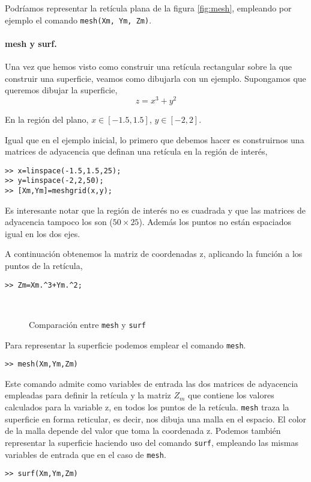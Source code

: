 Podríamos representar la retícula plana de la figura \ref{fig:mesh}, empleando por ejemplo el comando \texttt{mesh(Xm, Ym, Zm)}.

\paragraph{mesh y surf.} Una vez que hemos visto como construir una retícula rectangular sobre la que construir una superficie, veamos como dibujarla con un ejemplo. Supongamos que queremos dibujar la superficie,
\begin{equation*}
z=x^3+y^2
\end{equation*}

En la región del plano, $x\in[-1.5,1.5]$, $y\in[-2,2]$. 

Igual que en el ejemplo inicial, lo primero que debemos hacer es construirnos una matrices de adyacencia que definan una retícula en la región de interés,
\begin{verbatim}
>> x=linspace(-1.5,1.5,25);
>> y=linspace(-2,2,50);
>> [Xm,Ym]=meshgrid(x,y);
\end{verbatim}

Es interesante notar que la región de interés no es cuadrada y que las matrices de adyacencia tampoco los son ($50\times 25$). Además los puntos no están espaciados igual en los dos ejes.

A continuación obtenemos la matriz de coordenadas z, aplicando la función a los puntos de la retícula,

\begin{verbatim}
>> Zm=Xm.^3+Ym.^2;
\end{verbatim}

\begin{figure}[h]
\centering
{} %
{}\\
\caption{Comparación entre \texttt{mesh} y \texttt{surf}}
\end{figure}

Para representar la superficie podemos emplear el comando \texttt{mesh}. 
\begin{verbatim}
>> mesh(Xm,Ym,Zm)
\end{verbatim}

Este comando admite como variables de entrada las dos matrices de adyacencia empleadas para definir la retícula y la matriz $Z_m$ que contiene los valores calculados para la  variable z, en todos los puntos de la retícula. \texttt{mesh} traza la superficie en forma reticular, es decir, nos dibuja una malla en el espacio. El color de la malla depende del valor que toma la coordenada z. Podemos también representar la superficie haciendo uso del comando \texttt{surf}, empleando las mismas variables de entrada que en el caso de \texttt{mesh}. 
\begin{verbatim}
>> surf(Xm,Ym,Zm)
\end{verbatim}

